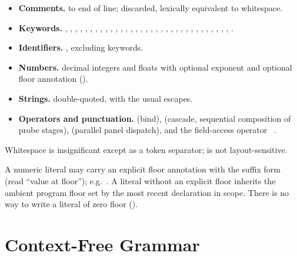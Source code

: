 \begin{definition}
\label{cfc:def:tokens}
\leavevmode
\begin{itemize}[leftmargin=1.4em,itemsep=1pt]
\item \textbf{Comments.} \cfckw{--} to end of line; discarded, lexically
equivalent to whitespace.
\item \textbf{Keywords.} , , , ,
, , , , , ,
, , , , ,
, , , , , ,
, , , , , , ,
, , , , ,
.
\item \textbf{Identifiers.} \cfckw{[A-Za-z\_][A-Za-z0-9\_]*}, excluding keywords.
\item \textbf{Numbers.} decimal integers and floats with optional exponent and
optional floor annotation ().
\item \textbf{Strings.} double-quoted, with the usual escapes.
\item \textbf{Operators and punctuation.} \cfckw{:=} (bind), \cfckw{>>} (cascade,
sequential composition of probe stages), \cfckw{||} (parallel panel dispatch),
 and the field-access operator \ .
\end{itemize}
Whitespace is insignificant except as a token separator;  is not
layout-sensitive.
\end{definition}

\begin{notation}
\label{cfc:not:floor-literal}
A numeric literal may carry an explicit floor annotation with the suffix form
 (read ``value at floor''); e.g.\ . A literal
without an explicit floor inherits the ambient program floor set by the most
recent  declaration in scope. There is no way to write a literal of
zero floor ().
\end{notation}

\section{Context-Free Grammar}
\label{cfc:sec:grammar}

